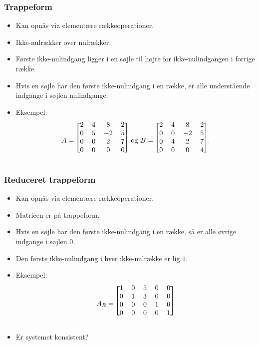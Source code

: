 \begin{frame}
\frametitle{Trappeform}
\begin{itemize}
\item Kan opnås via elementære rækkeoperationer. 
\item Ikke-nulrækker over nulrækker. 
\item Første ikke-nulindgang ligger i en søjle til højre for ikke-nulindgangen i forrige række. 
\item Hvis en søjle har den første ikke-nulindgang i en række, er alle understående indgange i søjlen nulindgange. 
\item Eksempel: 
\begin{align*}
A=
\begin{blockarray}{cccc}
\begin{block}{[cccc]}
2 & 4 & 8 & 2\\
0 & 5 & -2 & 5\\
0 & 0 & 2 & 7\\
0 & 0 & 0 & 0\\
\end{block}
\end{blockarray}
\text{ og }
B=
\begin{blockarray}{cccc}
\begin{block}{[cccc]}
2 & 4 & 8 & 2\\
0 & 0 & -2 & 5\\
0 & 4 & 2 & 7\\
0 & 0 & 0 & 4\\
\end{block}
\end{blockarray}.
\end{align*}
\end{itemize}
\end{frame}
\begin{frame}
\frametitle{Reduceret trappeform}
\begin{itemize}
\item Kan opnås via elementære rækkeoperationer. 
\item Matricen er på trappeform.
\item Hvis en søjle har den første ikke-nulindgang i en række, så er alle øvrige indgange i søjlen $0$.
\item Den første ikke-nulindgang i hver ikke-nulrække er lig $1$. 
\item Eksempel: 
\begin{align*}
A_R=
\begin{blockarray}{ccccc}
\begin{block}{[ccccc]}
1 & 0 & 5 & 0 & 0\\
0 & 1 & 3 & 0 & 0\\
0 & 0 & 0 & 1 & 0\\
0 & 0 & 0 & 0 & 1\\
\end{block}
\end{blockarray}
\end{align*}
\item Er systemet konsistent? 
\end{itemize}
\end{frame}
